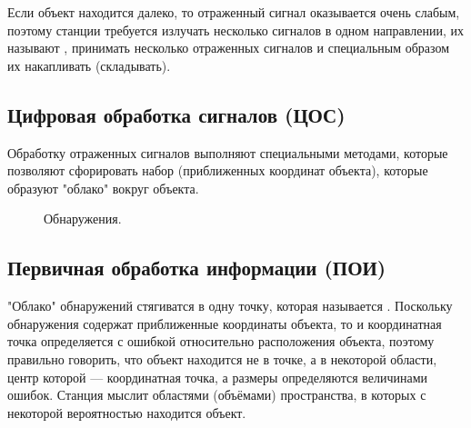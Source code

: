 Если объект находится далеко, то отраженный сигнал оказывается очень слабым, поэтому станции требуется излучать несколько сигналов в одном
направлении, их называют , принимать несколько отраженных сигналов и специальным образом их накапливать (складывать).

\subsection{Цифровая обработка сигналов (ЦОС)}

Обработку отраженных сигналов выполняют специальными методами, которые позволяют сфорировать набор  (приближенных
координат объекта), которые образуют "облако"{} вокруг объекта.

\begin{figure}[!ht]
    \centering
    \caption{Обнаружения.}
\end{figure}

\subsection{Первичная обработка информации (ПОИ)}

"Облако"{} обнаружений стягиватся в одну точку, которая называется . Поскольку обнаружения содержат
приближенные координаты объекта, то и координатная точка определяется с ошибкой относительно расположения объекта, поэтому
правильно говорить, что объект находится не в точке, а в некоторой области, центр которой --- координатная точка, а размеры определяются
величинами ошибок. Станция мыслит областями (объёмами) пространства, в которых с некоторой вероятностью находится объект.

